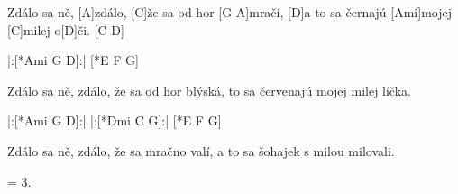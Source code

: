 
\sloka
[D]Zdálo sa ně, [A]zdálo,
[C]že sa od hor [G A]mračí,
[D]a to sa černajú [Ami]mojej [C]milej o[D]či. [C D]

|:[*Ami G D]:| [*E F G]

\sloka
Zdálo sa ně, zdálo,
že sa od hor blýská,
to sa červenajú mojej milej líčka.

|:[*Ami G D]:|
|:[*Dmi C G]:| [*E F G]

\sloka
Zdálo sa ně, zdálo,
že sa mračno valí,
a to sa šohajek s milou milovali.

\sloka
= 3.
